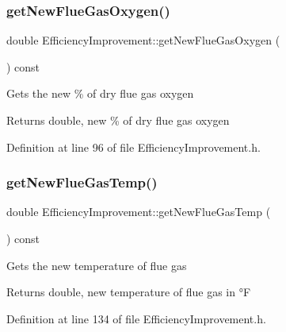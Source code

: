 \subsubsection{\texorpdfstring{get\+New\+Flue\+Gas\+Oxygen()}{getNewFlueGasOxygen()}\hspace{0.1cm}{\footnotesize\ttfamily [3/3]}}
{\footnotesize\ttfamily double Efficiency\+Improvement\+::get\+New\+Flue\+Gas\+Oxygen (\begin{DoxyParamCaption}{ }\end{DoxyParamCaption}) const\hspace{0.3cm}{\ttfamily [inline]}}

Gets the new \% of dry flue gas oxygen

\begin{DoxyReturn}{Returns}
double, new \% of dry flue gas oxygen 
\end{DoxyReturn}


Definition at line 96 of file Efficiency\+Improvement.\+h.

\mbox{\label{class_efficiency_improvement_a4de84ef27e3b4c518319fea77d039845}} 
\subsubsection{\texorpdfstring{get\+New\+Flue\+Gas\+Temp()}{getNewFlueGasTemp()}\hspace{0.1cm}{\footnotesize\ttfamily [1/3]}}
{\footnotesize\ttfamily double Efficiency\+Improvement\+::get\+New\+Flue\+Gas\+Temp (\begin{DoxyParamCaption}{ }\end{DoxyParamCaption}) const\hspace{0.3cm}{\ttfamily [inline]}}

Gets the new temperature of flue gas

\begin{DoxyReturn}{Returns}
double, new temperature of flue gas in °F 
\end{DoxyReturn}


Definition at line 134 of file Efficiency\+Improvement.\+h.

\mbox{\label{class_efficiency_improvement_a4de84ef27e3b4c518319fea77d039845}} 
